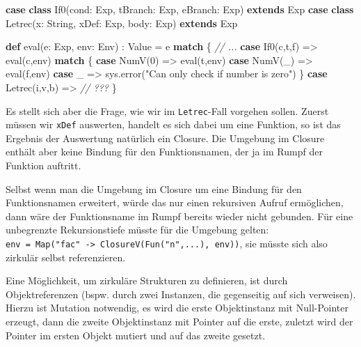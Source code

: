 \documentclass[]{article}
\newenvironment{Shaded}{}{}
\newcommand{\CommentTok}[1]{\textcolor[rgb]{0.38,0.63,0.69}{\textit{#1}}}
\newcommand{\DecValTok}[1]{\textcolor[rgb]{0.25,0.63,0.44}{#1}}
\newcommand{\FunctionTok}[1]{\textcolor[rgb]{0.02,0.16,0.49}{#1}}
\newcommand{\KeywordTok}[1]{\textcolor[rgb]{0.00,0.44,0.13}{\textbf{#1}}}
\newcommand{\NormalTok}[1]{#1}
\newcommand{\StringTok}[1]{\textcolor[rgb]{0.25,0.44,0.63}{#1}}
\begin{document}
\begin{Shaded}
\begin{Highlighting}[]
\KeywordTok{case} \KeywordTok{class} \FunctionTok{If0}\NormalTok{(cond: Exp, tBranch: Exp, eBranch: Exp) }\KeywordTok{extends}\NormalTok{ Exp}
\KeywordTok{case} \KeywordTok{class} \FunctionTok{Letrec}\NormalTok{(x: String, xDef: Exp, body: Exp) }\KeywordTok{extends}\NormalTok{ Exp}

\KeywordTok{def} \FunctionTok{eval}\NormalTok{(e: Exp, env: Env) : Value = e }\KeywordTok{match}\NormalTok{ \{}
  \CommentTok{// ...}
  \KeywordTok{case} \FunctionTok{If0}\NormalTok{(c,t,f) =\textgreater{} }\FunctionTok{eval}\NormalTok{(c,env) }\KeywordTok{match}\NormalTok{ \{}
    \KeywordTok{case} \FunctionTok{NumV}\NormalTok{(}\DecValTok{0}\NormalTok{) =\textgreater{} }\FunctionTok{eval}\NormalTok{(t,env)}
    \KeywordTok{case} \FunctionTok{NumV}\NormalTok{(\_) =\textgreater{} }\FunctionTok{eval}\NormalTok{(f,env)}
    \KeywordTok{case}\NormalTok{ \_ =\textgreater{} sys.}\FunctionTok{error}\NormalTok{(}\StringTok{"Can only check if number is zero"}\NormalTok{)}
\NormalTok{  \}}
  \KeywordTok{case} \FunctionTok{Letrec}\NormalTok{(i,v,b) =\textgreater{} }\CommentTok{// ???}
\NormalTok{\}}
\end{Highlighting}
\end{Shaded}

Es stellt sich aber die Frage, wie wir im \texttt{Letrec}-Fall vorgehen
sollen. Zuerst müssen wir \texttt{xDef} auswerten, handelt es sich dabei
um eine Funktion, so ist das Ergebnis der Auswertung natürlich ein
Closure. Die Umgebung im Closure enthält aber keine Bindung für den
Funktionsnamen, der ja im Rumpf der Funktion auftritt.

Selbst wenn man die Umgebung im Closure um eine Bindung für den
Funktionsnamen erweitert, würde das nur einen rekursiven Aufruf
ermöglichen, dann wäre der Funktionsname im Rumpf bereits wieder nicht
gebunden. Für eine unbegrenzte Rekursionstiefe müsste für die Umgebung
gelten:
\texttt{env\ =\ Map("fac"\ -\textgreater{}\ ClosureV(Fun("n",...),\ env))},
sie müsste sich also zirkulär selbst referenzieren.

Eine Möglichkeit, um zirkuläre Strukturen zu definieren, ist durch
Objektreferenzen (bspw. durch zwei Instanzen, die gegenseitig auf sich
verweisen). Hierzu ist Mutation notwendig, es wird die erste
Objektinstanz mit Null-Pointer erzeugt, dann die zweite Objektinstanz
mit Pointer auf die erste, zuletzt wird der Pointer im ersten Objekt
mutiert und auf das zweite gesetzt.
\end{document}
